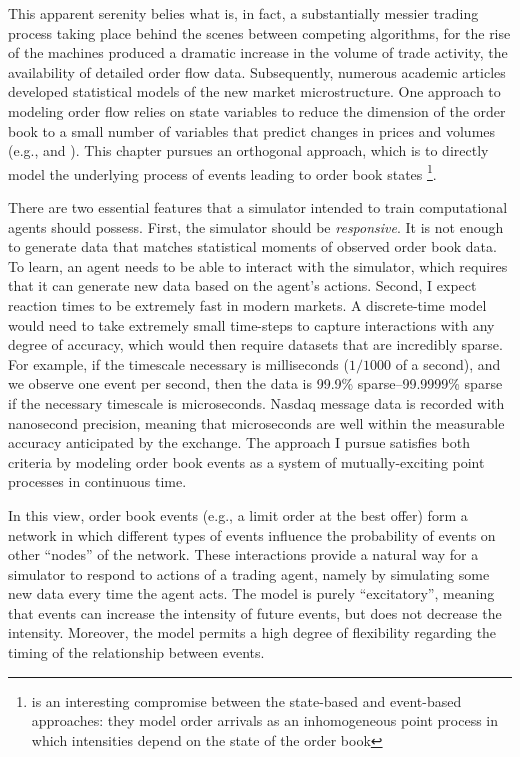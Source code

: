 This apparent serenity belies what is, in fact, a substantially messier trading process taking place behind the scenes between competing algorithms, for the rise of the machines produced a dramatic increase in the volume of trade activity, the availability of detailed order flow data. Subsequently, numerous academic articles developed statistical models of the new market microstructure. One approach to modeling order flow relies on state variables to reduce the dimension of the order book to a small number of variables that predict changes in prices and volumes (e.g., \cite{Avellaneda2011} and \cite{Cont2013B}). This chapter pursues an orthogonal approach, which is to directly model the underlying process of events leading to order book states \footnote{\cite{Huang2015} is an interesting compromise between the state-based and event-based approaches: they model order arrivals as an inhomogeneous point process in which intensities depend on the state of the order book}.

There are two essential features that a simulator intended to train computational agents should possess. First, the simulator should be \textit{responsive}. It is not enough to generate data that matches statistical moments of observed order book data. To learn, an agent needs to be able to interact with the simulator, which requires that it can generate new data based on the agent's actions. Second, I expect reaction times to be extremely fast in modern markets. A discrete-time model would need to take extremely small time-steps to capture interactions with any degree of accuracy, which would then require datasets that are incredibly sparse. For example, if the timescale necessary is milliseconds ($1/1000$ of a second), and we observe one event per second, then the data is 99.9\% sparse--99.9999\% sparse if the necessary timescale is microseconds. Nasdaq message data is recorded with nanosecond precision, meaning that microseconds are well within the measurable accuracy anticipated by the exchange. The approach I pursue satisfies both criteria by modeling order book events as a system of mutually-exciting point processes in continuous time.

In this view, order book events (e.g., a limit order at the best offer) form a network in which different types of events influence the probability of events on other ``nodes'' of the network. These interactions provide a natural way for a simulator to respond to actions of a trading agent, namely by simulating some new data every time the agent acts. The model is purely ``excitatory'', meaning that events can increase the intensity of future events, but does not decrease the intensity. Moreover, the model permits a high degree of flexibility regarding the timing of the relationship between events.

